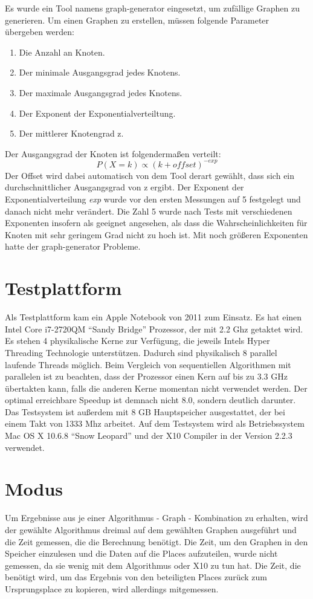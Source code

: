 Es wurde ein Tool namens graph-generator \cite{graph-generator:2009:Online} eingesetzt, um zufällige Graphen zu generieren. Um einen Graphen zu erstellen, müssen folgende Parameter übergeben werden:
\begin{enumerate}
	\item Die Anzahl an Knoten.
	\item Der minimale Ausgangsgrad jedes Knotens.
	\item Der maximale Ausgangsgrad jedes Knotens.
	\item Der Exponent der Exponentialverteiltung.
	\item Der mittlerer Knotengrad z.
\end{enumerate}
Der Ausgangsgrad der Knoten ist folgendermaßen verteilt:
$$
P(X=k) \propto (k + offset)^{-exp}
$$
Der Offset wird dabei automatisch von dem Tool derart gewählt, dass sich ein durchschnittlicher Ausgangsgrad von z ergibt. Der Exponent der Exponentialverteilung \textit{exp} wurde vor den ersten Messungen auf 5 festgelegt und danach nicht mehr verändert. Die Zahl 5 wurde nach Tests mit verschiedenen Exponenten insofern als geeignet angesehen, als dass die Wahrscheinlichkeiten für Knoten mit sehr geringem Grad nicht zu hoch ist. Mit noch größeren Exponenten hatte der graph-generator Probleme.

\section{Testplattform} %
\label{sec:testplattform}
Als Testplattform kam ein Apple Notebook von 2011 zum Einsatz. Es hat einen Intel Core i7-2720QM \enquote{Sandy Bridge} Prozessor, der mit 2.2 Ghz getaktet wird. Es stehen 4 physikalische Kerne zur Verfügung, die jeweils Intels Hyper Threading Technologie unterstützen. Dadurch sind physikalisch 8 parallel laufende Threads möglich. Beim Vergleich von sequentiellen Algorithmen mit parallelen ist zu beachten, dass der Prozessor einen Kern auf bis zu 3.3 GHz übertakten kann, falls die anderen Kerne momentan nicht verwendet werden. Der optimal erreichbare Speedup ist demnach nicht 8.0, sondern deutlich darunter. Das Testsystem ist außerdem mit 8 GB Hauptspeicher ausgestattet, der bei einem Takt von 1333 Mhz arbeitet. Auf dem Testsystem wird als Betriebssystem Mac OS X 10.6.8 \enquote{Snow Leopard} und der X10 Compiler in der Version 2.2.3 verwendet.

\section{Modus} %
\label{sec:modus}
Um Ergebnisse aus je einer Algorithmus - Graph - Kombination zu erhalten, wird der gewählte Algorithmus dreimal auf dem gewählten Graphen ausgeführt und die Zeit gemessen, die die Berechnung benötigt. Die Zeit, um den Graphen in den Speicher einzulesen und die Daten auf die Places aufzuteilen, wurde nicht gemessen, da sie wenig mit dem Algorithmus oder X10 zu tun hat. Die Zeit, die benötigt wird, um das Ergebnis von den beteiligten Places zurück zum Ursprungsplace zu kopieren, wird allerdings mitgemessen.

